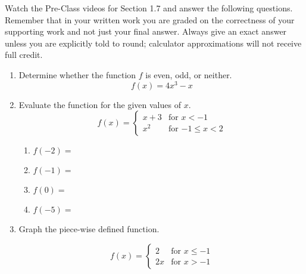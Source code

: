 


\noindent Watch the Pre-Class videos for Section 1.7 and answer the following questions. Remember that in your written work you are graded on the correctness of your supporting work and not just your final answer. Always give an exact answer unless you are explicitly told to round; calculator approximations will not receive full credit.

\begin{enumerate}

\item  Determine whether the function $f$ is even, odd, or neither.
 $$f(x)=4x^3-x$$


\vfill


\item  Evaluate the function for the given values of $x$.
\[
  f(x) =
  \begin{cases}
                                   x+3 & \text{for $x<-1$} \\
                                   x^2 & \text{for $-1 \leq x <2$}   \end{cases}
\]


\begin{enumerate}
\item $f(-2)=$\\
\item $f(-1)=$\\
\item $f(0)=$\\
\item $f(-5)=$\\


\end{enumerate}
\newpage

\item  Graph the piece-wise defined function.

\[
  f(x) =
  \begin{cases}
                                   2 & \text{for $x \leq -1$} \\
                                   2x & \text{for $x > -1$} 
                                     \end{cases}
\]












\end{enumerate}


